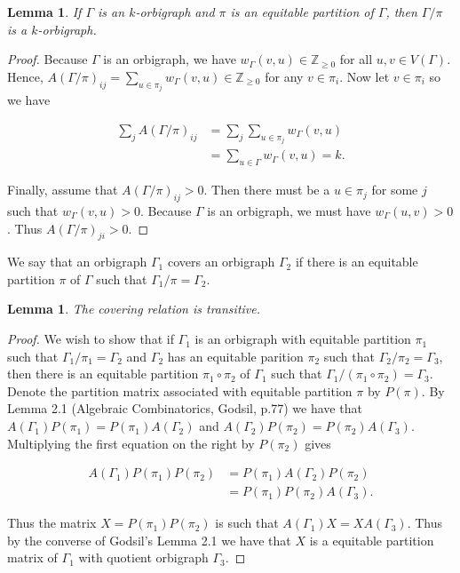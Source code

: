 \documentclass[12pt]{article}
\theoremstyle{plain}
\newtheorem{lemma}[theorem]{Lemma}
\theoremstyle{definition}
\theoremstyle{remark}
\begin{document}
    \begin{lemma}\label{EqPartitionQuotient}
      If $\Gamma$ is an $k$-orbigraph and $\pi$ is an equitable partition of $\Gamma$, then $\Gamma / \pi$ is a $k$-orbigraph.
    \end{lemma}
    \begin{proof}
      Because $\Gamma$ is an orbigraph, we have $w_\Gamma(v, u) \in \mathbb{Z}_{\ge 0}$ for all $u, v \in V(\Gamma)$. Hence, $A(\Gamma / \pi)_{ij} = \sum_{u \in \pi_j} w_\Gamma(v, u) \in \mathbb{Z}_{\ge 0}$ for any $v \in \pi_i$. Now let $v \in \pi_i$ so we have
      
      \begin{align*}
        \sum_j A(\Gamma / \pi)_{ij} &= \sum_j \sum_{u \in \pi_j} w_\Gamma(v, u) \\
        &= \sum_{u \in \Gamma} w_\Gamma(v, u) = k.
      \end{align*}

      Finally, assume that $A(\Gamma / \pi)_{ij} > 0$. Then there must be a $u \in \pi_j$ for some $j$ such that $w_\Gamma(v, u) > 0$. Because $\Gamma$ is an orbigraph, we must have $w_\Gamma(u, v) > 0$. Thus $A(\Gamma / \pi)_{ji} > 0$.
    \end{proof}

    We say that an orbigraph $\Gamma_1$ covers an orbigraph $\Gamma_2$ if there is an equitable partition $\pi$ of $\Gamma$ such that $\Gamma_1 / \pi = \Gamma_2$.

    \begin{lemma}\label{CoveringTransitivity}
      The covering relation is transitive.
    \end{lemma}
    \begin{proof}
      We wish to show that if $\Gamma_1$ is an orbigraph with equitable partition $\pi_1$ such that $\Gamma_1 / \pi_1 = \Gamma_2$ and $\Gamma_2$ has an equitable parition $\pi_2$ such that $\Gamma_2 / \pi_2 = \Gamma_3$, then there is an equitable partition $\pi_1 \circ \pi_2$ of $\Gamma_1$ such that $\Gamma_1 / (\pi_1 \circ \pi_2) = \Gamma_3$. Denote the partition matrix associated with equitable partition $\pi$ by $P(\pi)$. By Lemma 2.1 (Algebraic Combinatorics, Godsil, p.77) we have that $A(\Gamma_1)P(\pi_1) = P(\pi_1)A(\Gamma_2)$ and $A(\Gamma_2)P(\pi_2) = P(\pi_2)A(\Gamma_3)$. Multiplying the first equation on the right by $P(\pi_2)$ gives
      
      \begin{align*}
        A(\Gamma_1)P(\pi_1)P(\pi_2) &= P(\pi_1)A(\Gamma_2)P(\pi_2) \\
        &= P(\pi_1)P(\pi_2)A(\Gamma_3).
      \end{align*}

      Thus the matrix $X = P(\pi_1)P(\pi_2)$ is such that $A(\Gamma_1) X = X A(\Gamma_3)$. Thus by the converse of Godsil's Lemma 2.1 we have that $X$ is a equitable partition matrix of $\Gamma_1$ with quotient orbigraph $\Gamma_3$.
    \end{proof}
\end{document}
